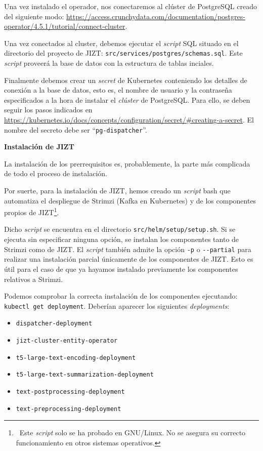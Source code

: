 Una vez instalado el operador, nos conectaremos al clúster de PostgreSQL creado del siguiente modo: \href{https://access.crunchydata.com/documentation/postgres-operator/4.5.1/tutorial/connect-cluster}{https://access.crunchydata.com/documentation/\newline postgres-operator/4.5.1/tutorial/connect-cluster}.

Una vez conectados al cluster, debemos ejecutar el \emph{script} SQL situado en el directorio del proyecto de JIZT: \texttt{src/services/postgres/schemas.sql}. Este \emph{script} proveerá la base de datos con la estructura de tablas inciales.

Finalmente debemos crear un \emph{secret} de Kubernetes conteniendo los detalles de conexión a la base de datos, esto es, el nombre de usuario y la contraseña especificados a la hora de instalar el \emph{clúster} de PostgreSQL. Para ello, se deben seguir los pasos indicados en \href{https://kubernetes.io/docs/concepts/configuration/secret/#creating-a-secret}{https://kubernetes.io/docs/\newline concepts/configuration/secret/\#creating-a-secret}.  El nombre del secreto debe ser ``\texttt{pg-dispatcher}''.

\vspace{0.5cm}
\noindent
\textbf{Instalación de JIZT}

La instalación de los prerrequisitos es, probablemente, la parte más complicada de todo el proceso de instalación.

Por suerte, para la instalación de JIZT, hemos creado un \emph{script} bash que automatiza el despliegue de Strimzi (Kafka en Kubernetes) y de los componentes propios de JIZT\footnote{\, Este \emph{script} solo se ha probado en GNU/Linux. No se asegura su correcto funcionamiento en otros sistemas operativos.}.

Dicho \emph{script} se encuentra en el directorio \texttt{src/helm/setup/setup.sh}. Si se ejecuta sin especificar ninguna opción, se instalan los componentes tanto de Strimzi como de JIZT. El \emph{script} también admite la opción \texttt{-p} o \texttt{-{}-partial} para realizar una instalación parcial únicamente de los componentes de JIZT. Esto es útil para el caso de que ya hayamos instalado previamente los componentes relativos a Strimzi.

Podemos comprobar la correcta instalación de los componentes ejecutando: \texttt{kubectl get deployment}. Deberían aparecer los siguientes \emph{deployments}:

\vspace{-0.3cm}
\begin{itemize} [\textbullet]
	\tightlist
	\item \texttt{dispatcher-deployment}
	\item \texttt{jizt-cluster-entity-operator}
	\item \texttt{t5-large-text-encoding-deployment}
	\item \texttt{t5-large-text-summarization-deployment}
	\item \texttt{text-postprocessing-deployment}
	\item \texttt{text-preprocessing-deployment}
\end{itemize}

